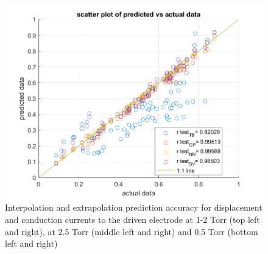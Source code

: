 \documentclass[12pt]{iopart}
\begin{document}
\begin{figure}[ht!]
\begin{center}
\begin{minipage}{0.495\textwidth}
\end{minipage}
\begin{minipage}{0.495\textwidth}
    \includegraphics[width=1\textwidth]{cond500mT.png}
\end{minipage}

\caption{Interpolation and extrapolation prediction accuracy for displacement and conduction currents to the driven electrode at 1-2 Torr (top left and right), at 2.5 Torr (middle left and right) and 0.5 Torr (bottom left and right) } 

\label{Fig:gap_SV,pressure_TB,species_TB}
\end{center}
\end{figure}


\end{document}
